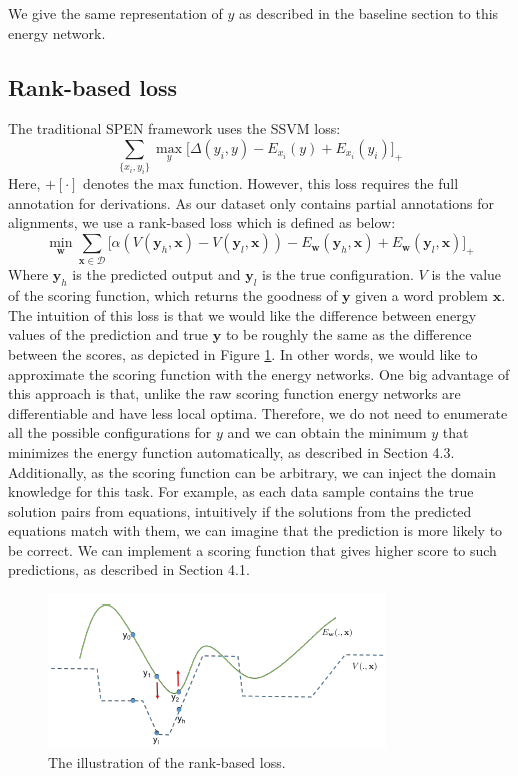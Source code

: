 \documentclass[11pt,letterpaper]{article}
\begin{document}
We give the same representation of $y$ as described in the baseline section to this energy network.
\subsection{Rank-based loss}
The traditional SPEN framework uses the SSVM loss:
\begin{equation}
\sum_{ \{x_i,y_i\} } \max_y \big[ \Delta(y_i, y) - E_{x_i}(y) + E_{x_i}(y_i) \big]_+
\end{equation}
Here, $+[ \cdot ]$ denotes the max function. However, this loss requires the full annotation for derivations. As our dataset only contains partial annotations for alignments, we use a rank-based loss which is defined as below:
{ \small
\begin{equation}
\min_\mathbf{w} \sum_{ \mathbf{x} \in \mathcal{D} } \big[ \alpha(V(\mathbf{y}_h, \mathbf{x}) - V(\mathbf{y}_l, \mathbf{x})) - E_{\mathbf{w}}(\mathbf{y}_h, \mathbf{x}) + E_{\mathbf{w}}(\mathbf{y}_l, \mathbf{x})  \big]_+
\end{equation}
}
Where $\mathbf{y}_h$ is the predicted output and $\mathbf{y}_l$ is the true configuration. $V$ is the value of the scoring function, which returns the goodness of $\mathbf{y}$ given a word problem $\mathbf{x}$. The intuition of this loss is that we would like the difference between energy values of the prediction and true $\mathbf{y}$ to be roughly the same as the difference between the scores, as depicted in Figure \ref{rank-loss}. In other words, we would like to approximate the scoring function with the energy networks. One big advantage of this approach is that, unlike the raw scoring function energy networks are differentiable and have less local optima. Therefore, we do not need to enumerate all the possible configurations for $y$ and we can obtain the minimum $y$ that minimizes the energy function automatically, as described in Section 4.3.
Additionally, as the scoring function can be arbitrary, we can inject the domain knowledge for this task. For example, as each data sample contains the true solution pairs from equations, intuitively if the solutions from the predicted equations match with them, we can imagine that the prediction is more likely to be correct. We can implement a scoring function that gives higher score to such predictions, as described in Section 4.1.
%
\begin{figure}[ht]
	\centering
	\includegraphics[bb=0 0 338 154, scale=0.5]{rank-based_loss}
    \caption{The illustration of the rank-based loss.}
    \label{rank-loss}
\end{figure}
\end{document}
